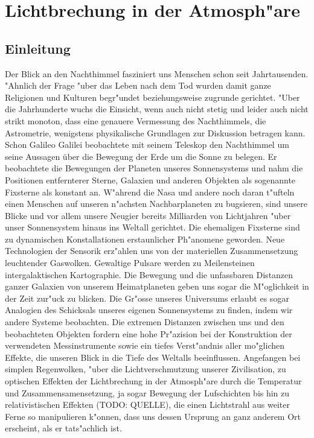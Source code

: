 \chapter{Lichtbrechung in der Atmosph"are\label{chapter:licht}}
\begin{refsection}


\section{Einleitung}
Der Blick an den Nachthimmel fasziniert uns Menschen schon seit Jahrtausenden. "Ahnlich der Frage "uber das Leben nach dem Tod wurden damit ganze Religionen und Kulturen begr"undet beziehungsweise zugrunde gerichtet. 
"Uber die Jahrhunderte wuchs die Einsicht, wenn auch nicht stetig und leider auch nicht strikt monoton, dass eine genauere Vermessung des Nachthimmels, die Astrometrie, wenigstens physikalische Grundlagen zur Diskussion betragen kann. 
Schon Galileo Galilei beobachtete mit seinem Teleskop den Nachthimmel um seine Aussagen über die Bewegung der Erde um die Sonne zu belegen.
Er beobachtete die Bewegungen der Planeten unseres Sonnensystems und nahm die Positionen entfernterer Sterne, Galaxien und anderen Objekten als sogenannte Fixsterne als konstant an. 
W"ahrend die Nasa und andere noch daran t"ufteln einen Menschen auf unseren n"achsten Nachbarplaneten zu bugsieren, sind unsere Blicke und vor allem unsere Neugier bereits Milliarden von Lichtjahren "uber unser Sonnensystem hinaus ins Weltall gerichtet. 
Die ehemaligen Fixsterne sind zu dynamischen Konstallationen erstaunlicher Ph"anomene geworden.
Neue Technologien der Sensorik erz"ahlen uns von der materiellen Zusammensetzung leuchtender Gaswolken. 
Gewaltige Pulsare werden zu Meilensteinen intergalaktischen Kartographie. 
Die Bewegung und die unfassbaren Distanzen ganzer Galaxien von unserem Heimatplaneten geben uns sogar die M"oglichkeit in der Zeit zur"uck zu blicken.
Die Gr"osse unseres Universums  erlaubt es sogar Analogien des Schicksals unseres eigenen Sonnensystems zu finden, indem wir andere Systeme beobachten. 
Die extremen Distanzen zwischen uns und den beobachteten Objekten fordern eine hohe Pr"azision bei der Konstruktion der verwendeten Messinstrumente sowie ein tiefes Verst"andnis aller mo"glichen Effekte, die unseren Blick in die Tiefe des Weltalls beeinflussen. 
Angefangen bei simplen Regenwolken, "uber die Lichtverschmutzung unserer Zivilisation, zu optischen Effekten der Lichtbrechung in der Atmosph"are durch die Temperatur und Zusammensamensetzung, ja sogar Bewegung der Lufschichten bis hin zu relativistischen Effekten (TODO: QUELLE), die einen Lichtstrahl aus weiter Ferne so manipulieren k"onnen, dass uns dessen Ursprung an ganz anderem Ort erscheint, als er tats"achlich ist. 

\end{refsection}
